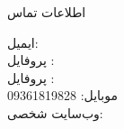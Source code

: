 \documentclass{resume} %
\begin{document}



\begin{rSection}{اطلاعات تماس}
\begin{multicols}{2}
ایمیل: \\
پروفایل :  \\
پروفایل :  \\

\vfill\null
\columnbreak
موبایل: 09361819828 \\
وب‌سایت شخصی: \\
%
\end{multicols}
\end{rSection}

\end{document}

